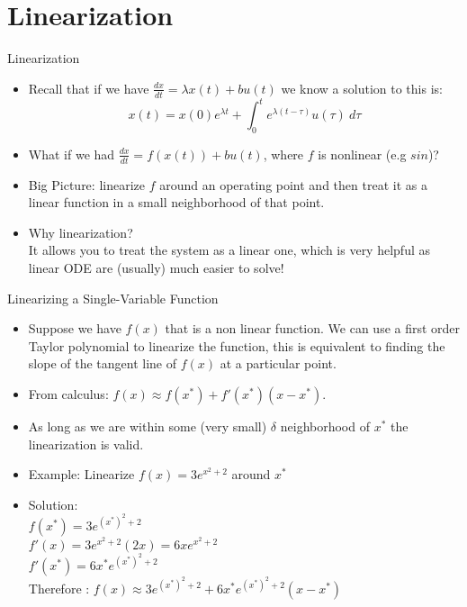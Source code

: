
\section{Linearization}

\begin{frame}{Linearization}
\begin{itemize}


\item Recall that if we have $\frac{dx}{dt} = \lambda x(t) + bu(t)$ we know a solution to this is: $$x(t) = x(0)e^{\lambda t} + \int_0^t \! e^{\lambda(t - \tau)}u(\tau)\ d\tau$$
\item What if we had $\frac{dx}{dt} = f(x(t)) + bu(t)$, where $f$ is nonlinear (e.g $sin$)? \pause \\
\item Big Picture: linearize $f$ around an operating point and then treat it as a linear function in a small neighborhood of that point.\\
\item Why linearization? \pause
\\ It allows you to treat the system as a linear one, which is very helpful as linear ODE are (usually) much easier to solve!
\end{itemize}
\end{frame}
\begin{frame}{Linearizing a Single-Variable Function}
\begin{itemize}
\item Suppose we have $f(x)$ that is a non linear function. We can use a first order Taylor polynomial to linearize the function, this is equivalent to finding the slope of the tangent line of $f(x)$ at a particular point.
\item From calculus: $f(x) \approx f(x^*) + f'(x^*)(x - x^*)$.
\item As long as we are within some (very small) $\delta$ neighborhood of $x^*$ the linearization is valid.
\item Example: Linearize $f(x) = 3e^{x^2 + 2}$ around $x^*$ 
    \pause
\item Solution: \\
    $f(x^*) = 3e^{(x^{*})^2 + 2}$\\
$f'(x) = 3e^{x^2+2}(2x) = 6xe^{x^2+2}$\\
        $f'(x^*) = 6x^*e^{(x^{*})^2+2}$\\
Therefore :
        $f(x) \approx 3e^{(x^{*})^2 + 2} +  6x^*e^{(x^{*})^2+2}(x-x^*) $
\end{itemize}

\end{frame}
